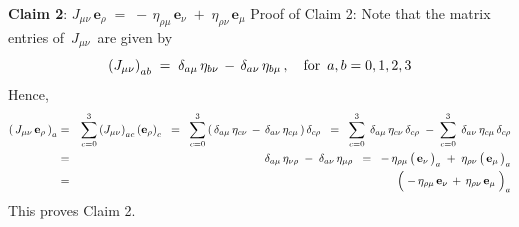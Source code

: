 \begin{enumerate}
	\vskip 0.3cm
	\noindent
	\textbf{Claim 2}:\quad
	$
	J_{\mu\nu}\,\mathbf{e}_{\rho}
	\; = \;
		-\,\eta_{\rho\mu}\,\mathbf{e}_{\nu}
		\;+\;
		\eta_{\rho\nu}\,\mathbf{e}_{\mu}
	$
	\vskip 0.1cm
	\noindent
	Proof of Claim 2:\;\;
	Note that the matrix entries of \,$J_{\mu\nu}$\, are given by
	\begin{equation*}
	\left(J_{\mu\nu}\right)_{ab}
	\; = \;
		\delta_{a\mu}\,\eta_{b\nu}
		\,-\,
		\delta_{a\nu}\,\eta_{b\mu}\,,
		\quad
		\textnormal{for \,$a, b = 0,1,2,3$}
	\end{equation*}
	Hence,
	\begin{eqnarray*}
	\left(\,J_{\mu\nu}\,\mathbf{e}_{\rho}\,\right)_{a}
	& = &
		\overset{3}{\underset{c=0}{\sum}}
		\left(J_{\mu\nu}\right)_{ac}
		\left(\mathbf{e}_{\rho}\right)_{c}
	\;\; = \;\;
		\overset{3}{\underset{c=0}{\sum}}
		\left(\,
			\delta_{a\mu}\,\eta_{c\nu}
			\,-\,
			\delta_{a\nu}\,\eta_{c\mu}
			\,\right)
		\delta_{c\rho}
	\;\; = \;\;
		\overset{3}{\underset{c=0}{\sum}}\;\,
		\delta_{a\mu}\,\eta_{c\nu}\,\delta_{c\rho}
		\; - \;
		\overset{3}{\underset{c=0}{\sum}}\;\,
		\delta_{a\nu}\,\eta_{c\mu}\,\delta_{c\rho}
	\\
	& = &
		\delta_{a\mu}\,\eta_{\nu\rho}
		\; - \;
		\delta_{a\nu}\,\eta_{\mu\rho}
	\;\; = \;\;
		-\,\eta_{\rho\mu}\left(\,\overset{{\color{white}.}}{\mathbf{e}_{\nu}}\,\right)_{a}
		\;+\;
		\eta_{\rho\nu}\left(\,\overset{{\color{white}.}}{\mathbf{e}_{\mu}}\,\right)_{a}
	\\
	& = &
		\left(\;
			-\,\eta_{\rho\mu}\,\mathbf{e}_{\nu}
			\,\overset{{\color{white}.}}{+}\,
			\eta_{\rho\nu}\,\mathbf{e}_{\mu}
			\;\right)_{a}
	\end{eqnarray*}
	This proves Claim 2.


\end{enumerate}

